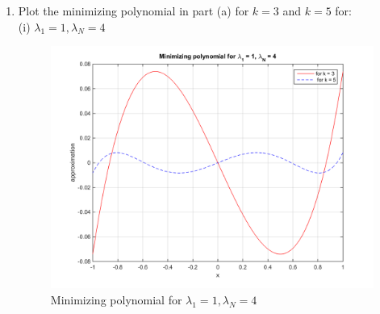 \documentclass[14pt,a4paper]{article}
\begin{document}
\begin{enumerate}
	
	\label{4c}
	\item Plot the minimizing polynomial in part (a) for $k = 3$ and $k=5$ for:\\
	(i) $\lambda_1 = 1, \lambda_N = 4$
	\begin{figure}[htp]
		\centering
		\includegraphics[scale=0.6]{hw3_414.png}
		\caption{Minimizing polynomial for $\lambda_1 = 1, \lambda_N = 4$}
	\end{figure}\\
	\pagebreak
	

\end{enumerate}
\end{document}
